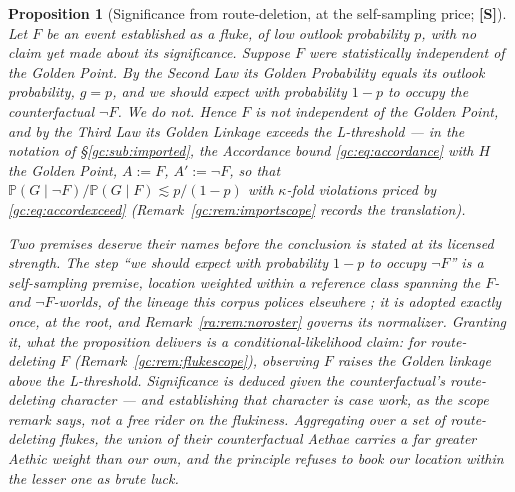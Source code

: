 \documentclass[11pt]{article}
\numberwithin{equation}{section}
\theoremstyle{plain}
\newtheorem{proposition}[theorem]{Proposition}
\theoremstyle{definition}
\theoremstyle{remark}
\newcommand{\PP}{\mathbb{P}}
\begin{document}
\begin{proposition}[Significance from route-deletion, at the
self-sampling price; \textbf{[S]}]
\label{gc:prop:flukes}
Let $F$ be an event established as a \emph{fluke}, of low outlook
probability $p$, with no claim yet made about its significance.
Suppose $F$ were statistically independent of the Golden Point. By the
Second Law its Golden Probability equals its outlook probability, $g=p$,
and we should expect with probability $1-p$ to occupy the counterfactual
$\neg F$. We do not. Hence $F$ is not independent of the Golden Point,
and by the Third Law its Golden Linkage exceeds the L-threshold
\cite{Nexus, GoldenScience22} --- in the notation of
\S\ref{gc:sub:imported}, the Accordance bound \eqref{gc:eq:accordance}
with $H$ the Golden Point, $A:=F$, $A':=\neg F$, so that
$\PP(G\mid\neg F)/\PP(G\mid F)\lesssim p/(1-p)$ with $\kappa$-fold
violations priced by \eqref{gc:eq:accordexceed}
(Remark~\ref{gc:rem:importscope} records the translation).

Two premises deserve their names before the conclusion is stated at
its licensed strength. The step ``we should expect with probability
$1-p$ to occupy $\neg F$'' is a \emph{self-sampling} premise, location weighted within a reference class spanning the $F$- and
$\neg F$-worlds, of the lineage this corpus polices elsewhere
\cite{Bos02}; it is adopted exactly once, at the root, and
Remark~\ref{ra:rem:noroster} governs its normalizer. Granting it,
what the proposition delivers is a \emph{conditional-likelihood}
claim: \emph{for route-deleting $F$}
(Remark~\ref{gc:rem:flukescope}), observing $F$ raises the Golden
linkage above the L-threshold. Significance is deduced given the
counterfactual's route-deleting character --- and establishing that
character is case work, as the scope remark says, not a free rider on
the flukiness. Aggregating over a set of route-deleting flukes, the
union of their counterfactual Aethae carries a far greater Aethic
weight than our own, and the principle refuses to book our location
within the lesser one as brute luck.
\end{proposition}
\end{document}
